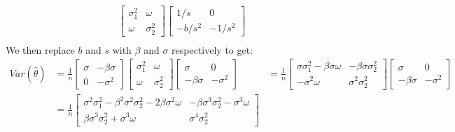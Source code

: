 \documentclass[12pt]{article}
\begin{document}
\begin{flushleft}
\begin{align*}
\begin{bmatrix}
    \sigma_1^2 & \omega\\
    \omega & \sigma_2^2
\end{bmatrix}
\begin{bmatrix}
    1/s & 0\\
    -b/s^2 & -1/s^2
\end{bmatrix}\\
\end{align*}
We then replace $b$ and $s$ with $\beta$ and $\sigma$ respectively to get:
\begin{align*}
 Var(\hat{\theta})&=\frac{1}{n}\begin{bmatrix}
    \sigma & -\beta\sigma\\
    0 & -\sigma^2
\end{bmatrix}
\begin{bmatrix}
    \sigma_1^2 & \omega\\
    \omega & \sigma_2^2
\end{bmatrix}
\begin{bmatrix}
    \sigma & 0\\
    -\beta\sigma & -\sigma^2
\end{bmatrix}   
&=\frac{1}{n}\begin{bmatrix}
    \sigma\sigma_1^2-\beta\sigma\omega & -\beta\sigma\sigma_2^2\\
    -\sigma^2\omega & \sigma^2\sigma_2^2
\end{bmatrix}
\begin{bmatrix}
    \sigma & 0\\
    -\beta\sigma & -\sigma^2
\end{bmatrix}\\
&=\frac{1}{n}\begin{bmatrix}
    \sigma^2\sigma_1^2-\beta^2\sigma^2\sigma_2^2-2\beta\sigma^2\omega & -\beta\sigma^3\sigma_2^2-\sigma^3\omega\\
    \beta\sigma^3\sigma_2^2+\sigma^3\omega & \sigma^4\sigma_2^2
\end{bmatrix}
\end{align*}

\end{flushleft}
\end{document}
